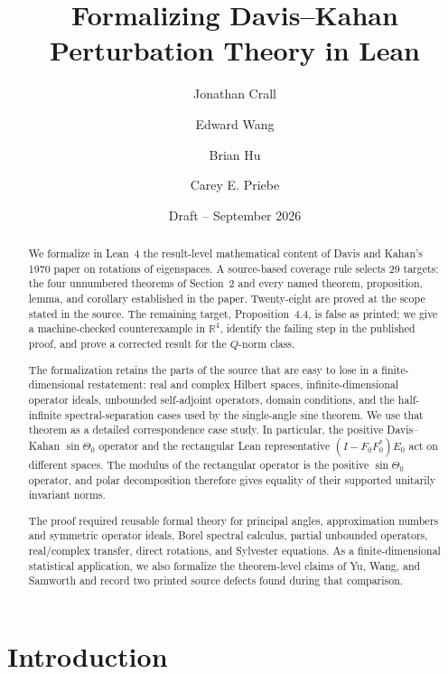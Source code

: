 \documentclass[11pt]{article}
\title{Formalizing Davis--Kahan Perturbation Theory in Lean}
\author[1]{Jonathan Crall}
\author[2]{Edward Wang}
\author[1]{Brian Hu}
\author[2]{Carey E. Priebe}
\affil[1]{%
  Kitware, Inc.\\
  \texttt{jon.crall@kitware.com},
  \texttt{brian.hu@kitware.com}
}
\affil[2]{%
  Johns Hopkins University\\
  \texttt{ewang43@jhu.edu},
  \texttt{cep@jhu.edu}
}
\date{Draft -- September 2026}
\newcommand{\DKResultCount}{29}
\begin{document}
\maketitle

\begin{abstract}
We formalize in Lean~4 the result-level mathematical content of Davis and
Kahan's 1970 paper on rotations of eigenspaces.  A source-based coverage rule
selects \DKResultCount{} targets: the four unnumbered theorems of Section~2 and
every named theorem, proposition, lemma, and corollary established in the
paper.  Twenty-eight are proved at the scope stated in the source.  The
remaining target, Proposition~4.4, is false as printed; we give a
machine-checked counterexample in $\mathbb{R}^4$, identify the failing step in
the published proof, and prove a corrected result for the $Q$-norm class.

The formalization retains the parts of the source that are easy to lose in a
finite-dimensional restatement: real and complex Hilbert spaces,
infinite-dimensional operator ideals, unbounded self-adjoint operators, domain
conditions, and the half-infinite spectral-separation cases used by the
single-angle sine theorem.  We use that theorem as a detailed correspondence
case study.  In particular, the positive Davis--Kahan $\sin\Theta_0$ operator
and the rectangular Lean representative $(I-F_0F_0^*)E_0$ act on different
spaces.  The modulus of the rectangular operator is the positive
$\sin\Theta_0$ operator, and polar decomposition therefore gives equality of
their supported unitarily invariant norms.

The proof required reusable formal theory for principal angles, approximation
numbers and symmetric operator ideals, Borel spectral calculus, partial
unbounded operators, real/complex transfer, direct rotations, and Sylvester
equations.  As a finite-dimensional statistical application, we also formalize
the theorem-level claims of Yu, Wang, and Samworth and record two printed source
defects found during that comparison.
\end{abstract}

\section{Introduction}
\label{sec:introduction}
\end{document}
